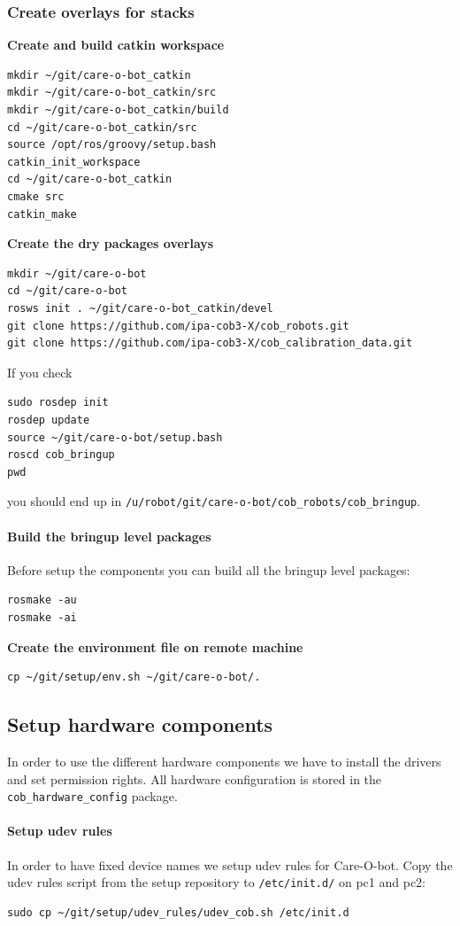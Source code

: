\subsubsection{Create overlays for stacks}
\textbf{Create and build  catkin workspace}
\begin{lstlisting}
mkdir ~/git/care-o-bot_catkin
mkdir ~/git/care-o-bot_catkin/src
mkdir ~/git/care-o-bot_catkin/build
cd ~/git/care-o-bot_catkin/src
source /opt/ros/groovy/setup.bash
catkin_init_workspace
cd ~/git/care-o-bot_catkin
cmake src
catkin_make
\end{lstlisting}

\textbf{Create the dry packages overlays}
\begin{lstlisting}
mkdir ~/git/care-o-bot
cd ~/git/care-o-bot
rosws init . ~/git/care-o-bot_catkin/devel
git clone https://github.com/ipa-cob3-X/cob_robots.git
git clone https://github.com/ipa-cob3-X/cob_calibration_data.git
\end{lstlisting}

If you check 
\begin{lstlisting}
sudo rosdep init
rosdep update
source ~/git/care-o-bot/setup.bash
roscd cob_bringup
pwd
\end{lstlisting}
you should end up in \texttt{/u/robot/git/care-o-bot/cob\_robots/cob\_bringup}.

\paragraph{Build the bringup level packages}
Before setup the components you can build all the bringup level packages:
\begin{lstlisting}
rosmake -au
rosmake -ai
\end{lstlisting}

\textbf{Create the environment file on remote machine}
\begin{lstlisting}
cp ~/git/setup/env.sh ~/git/care-o-bot/.
\end{lstlisting}

\subsection{Setup hardware components}
In order to use the different hardware components we have to install the drivers and set permission rights. All hardware configuration is stored in the \texttt{cob\_hardware\_config} package.

\paragraph{Setup udev rules}
In order to have fixed device names we setup udev rules for Care-O-bot. Copy the udev rules script from the setup repository to \texttt{/etc/init.d/} on pc1 and pc2:
\begin{lstlisting}
sudo cp ~/git/setup/udev_rules/udev_cob.sh /etc/init.d
\end{lstlisting}

